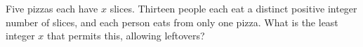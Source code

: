 Five pizzas each have $x$ slices. Thirteen people each eat a distinct positive integer number of slices, and each person eats from only one pizza. What is the least integer $x$ that permits this, allowing leftovers?
